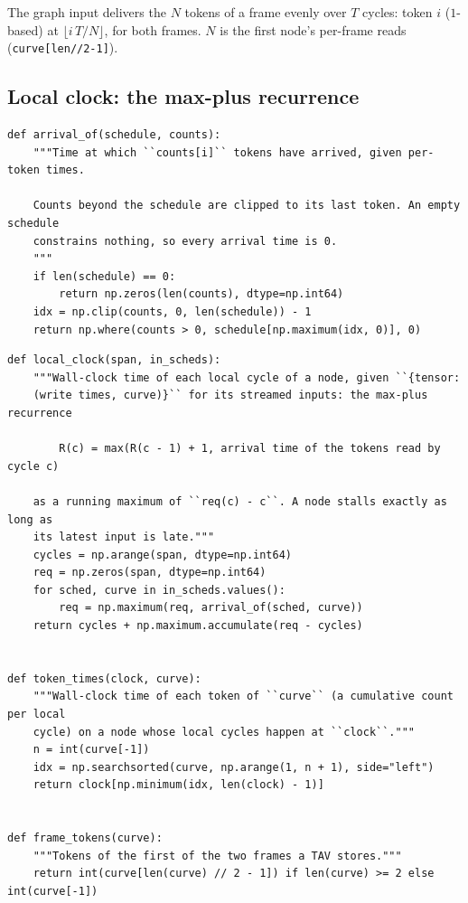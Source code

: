 \documentclass[10pt,a4paper]{article}
\newcommand{\code}[1]{\texttt{#1}}
\newcommand{\Tg}{T}           %
\newcommand{\NF}{N}            %
\begin{document}
The graph input delivers the $\NF$ tokens of a frame evenly over $\Tg$ cycles:
token $i$ ($1$-based) at $\lfloor i\,\Tg/\NF\rfloor$, for both frames. $\NF$ is
the first node's per-frame reads (\code{curve[len//2-1]}).

\subsection{Local clock: the max-plus recurrence}

\begin{lstlisting}[firstnumber=294,title={\texttt{src/finn/transformation/fpgadataflow/derive\_characteristic.py}, lines 294--303}]
def arrival_of(schedule, counts):
    """Time at which ``counts[i]`` tokens have arrived, given per-token times.

    Counts beyond the schedule are clipped to its last token. An empty schedule
    constrains nothing, so every arrival time is 0.
    """
    if len(schedule) == 0:
        return np.zeros(len(counts), dtype=np.int64)
    idx = np.clip(counts, 0, len(schedule)) - 1
    return np.where(counts > 0, schedule[np.maximum(idx, 0)], 0)
\end{lstlisting}
\begin{lstlisting}[firstnumber=700,title={\texttt{src/finn/transformation/fpgadataflow/derive\_characteristic.py}, lines 700--725}]
def local_clock(span, in_scheds):
    """Wall-clock time of each local cycle of a node, given ``{tensor:
    (write times, curve)}`` for its streamed inputs: the max-plus recurrence

        R(c) = max(R(c - 1) + 1, arrival time of the tokens read by cycle c)

    as a running maximum of ``req(c) - c``. A node stalls exactly as long as
    its latest input is late."""
    cycles = np.arange(span, dtype=np.int64)
    req = np.zeros(span, dtype=np.int64)
    for sched, curve in in_scheds.values():
        req = np.maximum(req, arrival_of(sched, curve))
    return cycles + np.maximum.accumulate(req - cycles)


def token_times(clock, curve):
    """Wall-clock time of each token of ``curve`` (a cumulative count per local
    cycle) on a node whose local cycles happen at ``clock``."""
    n = int(curve[-1])
    idx = np.searchsorted(curve, np.arange(1, n + 1), side="left")
    return clock[np.minimum(idx, len(clock) - 1)]


def frame_tokens(curve):
    """Tokens of the first of the two frames a TAV stores."""
    return int(curve[len(curve) // 2 - 1]) if len(curve) >= 2 else int(curve[-1])
\end{lstlisting}
\end{document}
